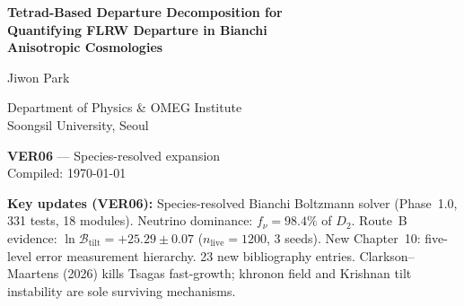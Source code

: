 \documentclass[12pt,a4paper]{report}
\begin{document}
\begin{titlepage}
\centering
\vspace*{3cm}
{\Huge\bfseries Tetrad-Based Departure Decomposition for\\[0.5em]
Quantifying FLRW Departure in Bianchi\\[0.5em]
Anisotropic Cosmologies\par}
\vspace{2cm}
{\Large Jiwon Park\par}
{\large Department of Physics \& OMEG Institute\\
Soongsil University, Seoul\par}
\vspace{1.5cm}
{\large \textbf{VER06} — Species-resolved expansion\\
Compiled: \today\par}
\vspace{1cm}
{\normalsize
\textbf{Key updates (VER06):}
Species-resolved Bianchi Boltzmann solver (Phase~1.0,
331 tests, 18 modules). Neutrino dominance:
$f_\nu = 98.4\%$ of $D_2$.
Route~B evidence: $\ln\mathcal{B}_{\mathrm{tilt}}
= +25.29 \pm 0.07$ ($n_{\mathrm{live}} = 1200$, 3 seeds).
New Chapter~10: five-level error measurement hierarchy.
23 new bibliography entries.
Clarkson--Maartens (2026) kills Tsagas fast-growth;
khronon field and Krishnan tilt instability are sole
surviving mechanisms.\par}
\end{titlepage}


\newcommand{\phantomlabel}[1]{\phantomsection\label{#1}}
\tableofcontents
\clearpage










\end{document}
